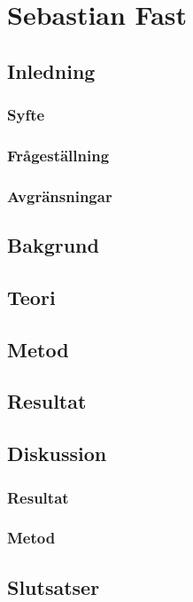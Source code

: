 \section{Sebastian Fast}
	\subsection{Inledning}
	\subsubsection{Syfte}
	\subsubsection{Frågeställning}
	\subsubsection{Avgränsningar}
	\subsection{Bakgrund}
	\subsection{Teori}
	\subsection{Metod}
	\subsection{Resultat}
	\subsection{Diskussion}
	\subsubsection{Resultat}
	\subsubsection{Metod}
	\subsection{Slutsatser}
